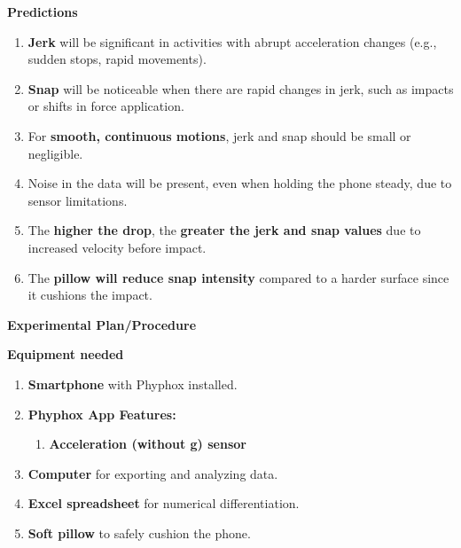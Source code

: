 \documentclass[idxtotoc,hyperref,openany]{labbook} %
\begin{document}
\hfill \break
\textbf{Predictions}
\begin{enumerate}[$\bullet$]
    \item \textbf{Jerk} will be significant in activities with abrupt acceleration changes (e.g., sudden stops, rapid movements).
    \item \textbf{Snap} will be noticeable when there are rapid changes in jerk, such as impacts or shifts in force application.
    \item For \textbf{smooth, continuous motions}, jerk and snap should be small or negligible.
    \item Noise in the data will be present, even when holding the phone steady, due to sensor limitations.
    \item The \textbf{higher the drop}, the \textbf{greater the jerk and snap values} due to increased velocity before impact.
    \item The \textbf{pillow will reduce snap intensity} compared to a harder surface since it cushions the impact.
\end{enumerate}

\hfill \break
\textbf{Experimental Plan/Procedure}

\hfill \break
\textbf{Equipment needed}
\begin{enumerate}[$\bullet$]
    \item \textbf{Smartphone} with Phyphox installed.
    \item \textbf{Phyphox App Features:}
    \begin{enumerate}[$\bullet$]
        \item \textbf{Acceleration (without g) sensor}
    \end{enumerate}
    \item \textbf{Computer} for exporting and analyzing data.
    \item \textbf{Excel spreadsheet} for numerical differentiation.
    \item \textbf{Soft pillow} to safely cushion the phone.
\end{enumerate}
\end{document}
